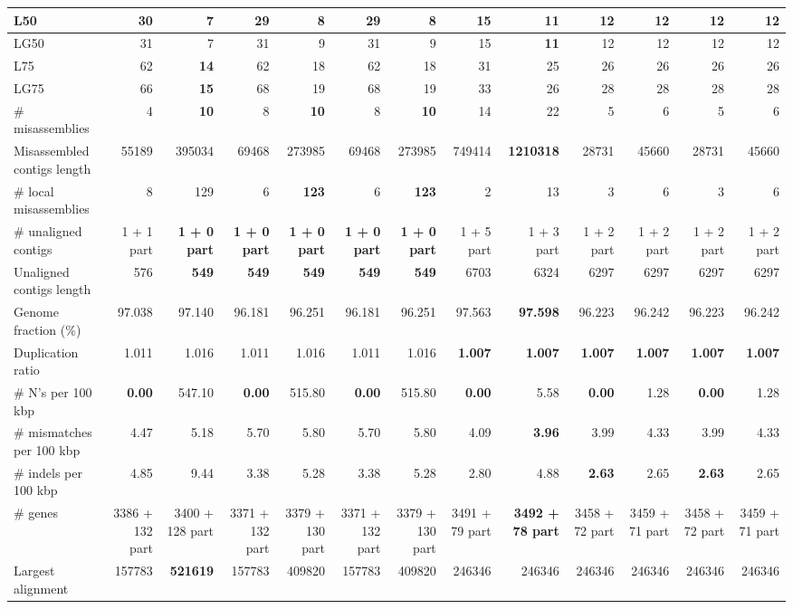 \documentclass[12pt,a4paper]{article}
\begin{document}
\begin{table}[ht]
\begin{center}
\begin{tabular}{|l*{12}{|r}|}
L50 & 30 & 7 & 29 & 8 & 29 & 8 & 15 & {\bf 11} & 12 & 12 & 12 & 12 \\ \hline
LG50 & 31 & 7 & 31 & 9 & 31 & 9 & 15 & {\bf 11} & 12 & 12 & 12 & 12 \\ \hline
L75 & 62 & {\bf 14} & 62 & 18 & 62 & 18 & 31 & 25 & 26 & 26 & 26 & 26 \\ \hline
LG75 & 66 & {\bf 15} & 68 & 19 & 68 & 19 & 33 & 26 & 28 & 28 & 28 & 28 \\ \hline
\# misassemblies & 4 & {\bf 10} & 8 & {\bf 10} & 8 & {\bf 10} & 14 & 22 & 5 & 6 & 5 & 6 \\ \hline
Misassembled contigs length & 55189 & 395034 & 69468 & 273985 & 69468 & 273985 & 749414 & {\bf 1210318} & 28731 & 45660 & 28731 & 45660 \\ \hline
\# local misassemblies & 8 & 129 & 6 & {\bf 123} & 6 & {\bf 123} & 2 & 13 & 3 & 6 & 3 & 6 \\ \hline
\# unaligned contigs & 1 + 1 part & {\bf 1 + 0 part} & {\bf 1 + 0 part} & {\bf 1 + 0 part} & {\bf 1 + 0 part} & {\bf 1 + 0 part} & 1 + 5 part & 1 + 3 part & 1 + 2 part & 1 + 2 part & 1 + 2 part & 1 + 2 part \\ \hline
Unaligned contigs length & 576 & {\bf 549} & {\bf 549} & {\bf 549} & {\bf 549} & {\bf 549} & 6703 & 6324 & 6297 & 6297 & 6297 & 6297 \\ \hline
Genome fraction (\%) & 97.038 & 97.140 & 96.181 & 96.251 & 96.181 & 96.251 & 97.563 & {\bf 97.598} & 96.223 & 96.242 & 96.223 & 96.242 \\ \hline
Duplication ratio & 1.011 & 1.016 & 1.011 & 1.016 & 1.011 & 1.016 & {\bf 1.007} & {\bf 1.007} & {\bf 1.007} & {\bf 1.007} & {\bf 1.007} & {\bf 1.007} \\ \hline
\# N's per 100 kbp & {\bf 0.00} & 547.10 & {\bf 0.00} & 515.80 & {\bf 0.00} & 515.80 & {\bf 0.00} & 5.58 & {\bf 0.00} & 1.28 & {\bf 0.00} & 1.28 \\ \hline
\# mismatches per 100 kbp & 4.47 & 5.18 & 5.70 & 5.80 & 5.70 & 5.80 & 4.09 & {\bf 3.96} & 3.99 & 4.33 & 3.99 & 4.33 \\ \hline
\# indels per 100 kbp & 4.85 & 9.44 & 3.38 & 5.28 & 3.38 & 5.28 & 2.80 & 4.88 & {\bf 2.63} & 2.65 & {\bf 2.63} & 2.65 \\ \hline
\# genes & 3386 + 132 part & 3400 + 128 part & 3371 + 132 part & 3379 + 130 part & 3371 + 132 part & 3379 + 130 part & 3491 + 79 part & {\bf 3492 + 78 part} & 3458 + 72 part & 3459 + 71 part & 3458 + 72 part & 3459 + 71 part \\ \hline
Largest alignment & 157783 & {\bf 521619} & 157783 & 409820 & 157783 & 409820 & 246346 & 246346 & 246346 & 246346 & 246346 & 246346 \\ \hline

\end{tabular}
\end{center}
\end{table}
\end{document}
